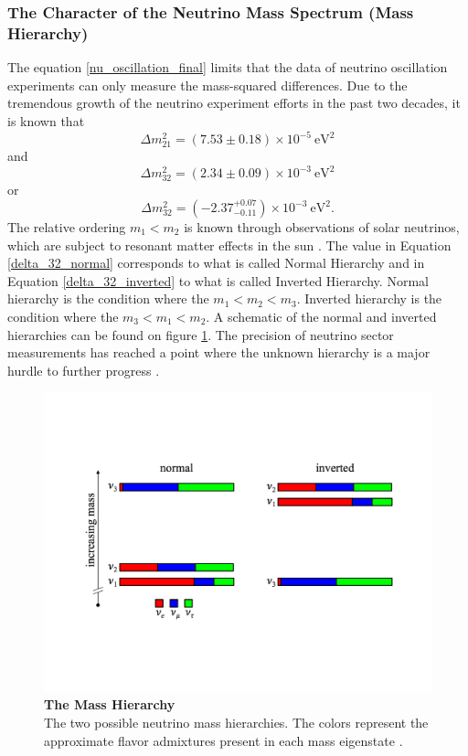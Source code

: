 \subsubsection{The Character of the Neutrino Mass Spectrum (Mass Hierarchy)}
%
The equation \ref{nu_oscillation_final} limits that the data of neutrino oscillation experiments can only measure the mass-squared differences. Due to the tremendous growth of the neutrino experiment efforts in the past two decades, it is known that \cite{delta_2_1}
%
\begin{equation}
	\Delta m^2_{21} = (7.53 \pm 0.18) \times 10^{-5} \ \text{eV}^2
	\label{delta_21}
\end{equation}
%
and \cite{delta_3_2}
%
\begin{equation}
	\Delta m^2_{32} = (2.34 \pm 0.09) \times 10^{-3} \ \text{eV}^2
	\label{delta_32_normal}
\end{equation}
%
or 
%
\begin{equation}
	\Delta m^2_{32} = (-2.37^{+0.07}_{-0.11}) \times 10^{-3} \ \text{eV}^2.
	\label{delta_32_inverted}
\end{equation}
%
The relative ordering $m_1 < m_2$ is known through observations of solar neutrinos, which are subject to resonant matter effects in the sun \cite{delta_2_1}. The value in Equation \ref{delta_32_normal} corresponds to what is called Normal Hierarchy and in Equation \ref{delta_32_inverted} to what is called Inverted Hierarchy. Normal hierarchy is the condition where the $m_1 < m_2 < m_3$. Inverted hierarchy is the condition where the $m_3 < m_1 < m_2$. A schematic of the normal and inverted hierarchies can be found on figure \ref{mass_hierarchy}. The precision of neutrino sector measurements has reached a point where the unknown hierarchy is a major hurdle to further progress \cite{prospects_patterson}.
%
\begin{figure}
	\begin{center}
		\includegraphics[scale=0.5]{Figures/mass_hierarchy.pdf}
		\caption[The Mass Hierarchy]{ {\textbf{The Mass Hierarchy}}\\The two possible neutrino mass hierarchies. The colors represent the approximate flavor admixtures present in each mass eigenstate \cite{prospects_patterson}.}
		\label{mass_hierarchy}	
	\end{center}
\end{figure}
%
